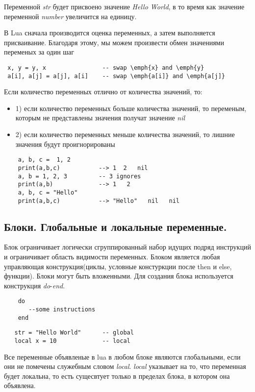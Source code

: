 Переменной \emph{str} будет присвоено значение \emph{Hello World}, в то время как значение переменной \emph{number} увеличится на единицу. 

В Lua сначала производится оценка переменных, а затем выполняется присваивание. Благодаря этому, мы можем произвести обмен значениями переменых за один шаг

\begin{lstlisting}
 x, y = y, x                -- swap \emph{x} and \emph{y}
 a[i], a[j] = a[j], a[i]    -- swap \emph{a[i]} and \emph{a[j]}
\end{lstlisting}

Если количество переменных отлично от количества значений, то:
\begin{itemize}
	\item 1) если количество переменных больше количества значений, то переменым, которым не представлены значения получат значение \emph{nil}
	\item 2) если количество переменных меньше количества значений, то лишние значения будут проигнорированы
\end{itemize}


\begin{lstlisting}
    a, b, c =  1, 2
    print(a,b,c)           --> 1  2   nil
    a, b = 1, 2, 3   	   -- 3 ignores
    print(a,b)             --> 1   2
    a, b, c = "Hello"
    print(a,b,c)           --> "Hello"   nil   nil
\end{lstlisting}

\subsection{ Блоки. Глобальные и локальные переменные.} 

Блок ограничивает логически сгруппированный набор  идущих подряд инструкций и ограничивает область видимости переменных. Блоком является любая управляющая конструкция(циклы, условные констуркции после then и else, функции). Блоки могут быть вложенными. Для создания блока используется конструкция \emph{do}-\emph{end}.
\begin{lstlisting}
	do
       --some instructions
    end         
\end{lstlisting}

\begin{lstlisting}
   str = "Hello World"      -- global
   local x = 10 			-- local
\end{lstlisting}

Все переменные объявленые в lua в любом блоке являются глобальными, если они не помечены служебным словом \emph{local}.
\emph{local} указывает на то, что переменная будет локальна, то есть сущесвтует только в пределах блока, в котором она объявлена. 


